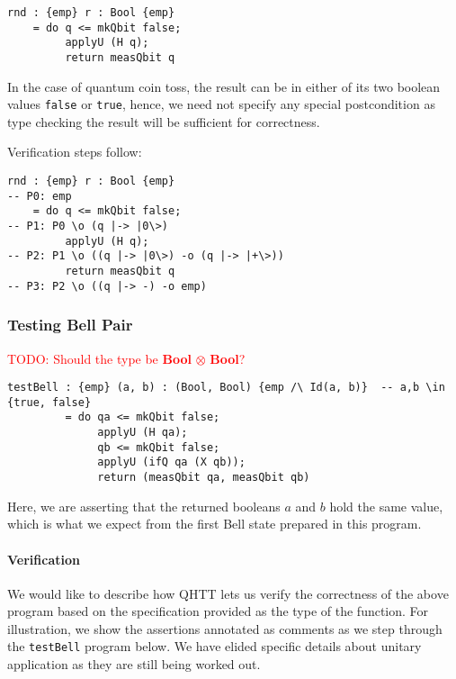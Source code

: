 \documentclass[acmsmall,nonacm,timestamp,review=false,anonymous=false]{acmart}
\newcommand{\type}[1]{\textrm{\textbf{#1}}}
\newcommand{\todo}[1]{\textcolor{red}{#1}}
\begin{document}
\begin{minipage}{0.95\linewidth}
\begin{lstlisting}[language=QHaskell]
rnd : {emp} r : Bool {emp}
    = do q <= mkQbit false;
         applyU (H q);
         return measQbit q
\end{lstlisting}
\end{minipage}

In the case of quantum coin toss, the result can be in either of its two boolean values \texttt{false} or \texttt{true}, hence, we need not specify any special postcondition as type checking the result will be sufficient for correctness.

Verification steps follow:

\begin{minipage}{0.95\linewidth}
\begin{lstlisting}[language=QHaskell]
rnd : {emp} r : Bool {emp}
-- P0: emp
    = do q <= mkQbit false;
-- P1: P0 \o (q |-> |0\>)
         applyU (H q);
-- P2: P1 \o ((q |-> |0\>) -o (q |-> |+\>))
         return measQbit q
-- P3: P2 \o ((q |-> -) -o emp)
\end{lstlisting}
\end{minipage}

\subsubsection{Testing Bell Pair}
\leavevmode
\todo{TODO: Should the type be \type{Bool} $\otimes$ \type{Bool}?}

\begin{minipage}{0.95\linewidth}
\begin{lstlisting}[language=QHaskell]
testBell : {emp} (a, b) : (Bool, Bool) {emp /\ Id(a, b)}  -- a,b \in {true, false}
         = do qa <= mkQbit false;
              applyU (H qa);
              qb <= mkQbit false;
              applyU (ifQ qa (X qb));
              return (measQbit qa, measQbit qb)
\end{lstlisting}
\end{minipage}

Here, we are asserting that the returned booleans $a$ and $b$ hold the same value, which is what we expect from the first Bell state prepared in this program.

\paragraph{Verification}
We would like to describe how QHTT lets us verify the correctness of the above program based on the specification provided as the type of the function. For illustration, we show the assertions annotated as comments as we step through the \texttt{testBell} program below. We have elided specific details about unitary application as they are still being worked out.
\end{document}

